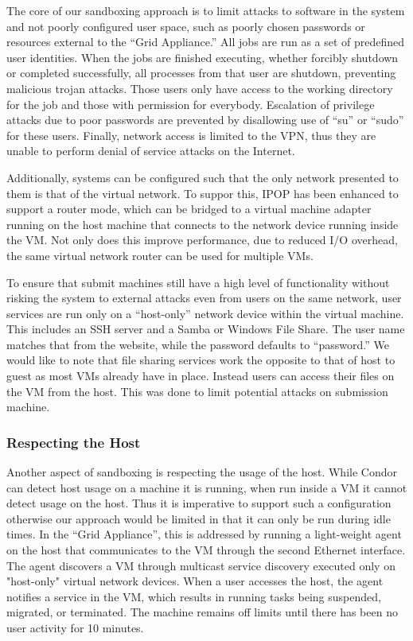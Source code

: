 \documentclass[conference]{IEEEtran}
\begin{document}
The core of our sandboxing approach is to limit attacks to software in the
system and not poorly configured user space, such as poorly chosen passwords or
resources external to the ``Grid Appliance.''  All jobs are run as a set of
predefined user identities.  When the jobs are finished executing, whether
forcibly shutdown or completed successfully, all processes from that user are
shutdown, preventing malicious trojan attacks.  Those users only have access to
the working directory for the job and those with permission for everybody.
Escalation of privilege attacks due to poor passwords are prevented by
disallowing use of ``su'' or ``sudo'' for these users.  Finally, network access
is limited to the VPN, thus they are unable to perform denial of service
attacks on the Internet.

Additionally, systems can be configured such that the only network presented to
them is that of the virtual network.  To suppor this, IPOP has been enhanced to
support a router mode, which can be bridged to a virtual machine adapter
running on the host machine that connects to the network device running inside
the VM.  Not only does this improve performance, due to reduced I/O overhead,
the same virtual network router can be used for multiple VMs.

To ensure that submit machines still have a high level of functionality without
risking the system to external attacks even from users on the same network,
user services are run only on a ``host-only'' network device within the virtual
machine.  This includes an SSH server and a Samba or Windows File Share.  The
user name matches that from the website, while the password defaults to
``password.''  We would like to note that file sharing services work the
opposite to that of host to guest as most VMs already have in place.  Instead
users can access their files on the VM from the host.  This was done to limit
potential attacks on submission machine.

\subsubsection{Respecting the Host}

Another aspect of sandboxing is respecting the usage of the host.  While Condor
can detect host usage on a machine it is running, when run inside a VM it
cannot detect usage on the host.  Thus it is imperative to support such a
configuration otherwise our approach would be limited in that it can only be
run during idle times.  In the ``Grid Appliance'', this is addressed by running
a light-weight agent on the host that communicates to the VM through the second
Ethernet interface.  The agent discovers a VM through multicast service
discovery executed only on "host-only" virtual network devices.  When a user
accesses the host, the agent notifies a service in the VM, which results in
running tasks being suspended, migrated, or terminated.  The machine remains
off limits until there has been no user activity for 10 minutes.
\end{document}
